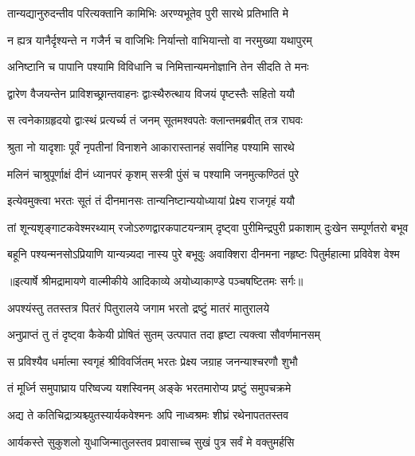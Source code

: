 \twolineshloka
{तान्यद्यानुरुदन्तीव परित्यक्तानि कामिभिः}
{अरण्यभूतेव पुरी सारथे प्रतिभाति मे} %

\twolineshloka
{न ह्यत्र यानैर्दृश्यन्ते न गजैर्न च वाजिभिः}
{निर्यान्तो वाभियान्तो वा नरमुख्या यथापुरम्} %

\twolineshloka
{अनिष्टानि च पापानि पश्यामि विविधानि च}
{निमित्तान्यमनोज्ञानि तेन सीदति ते मनः} %

\twolineshloka
{द्वारेण वैजयन्तेन प्राविशच्छ्रान्तवाहनः}
{द्वाःस्थैरुत्थाय विजयं पृष्टस्तैः सहितो ययौ} %

\twolineshloka
{स त्वनेकाग्रहृदयो द्वाःस्थं प्रत्यर्च्य तं जनम्}
{सूतमश्वपतेः क्लान्तमब्रवीत् तत्र राघवः} %

\twolineshloka
{श्रुता नो यादृशाः पूर्वं नृपतीनां विनाशने}
{आकारास्तानहं सर्वानिह पश्यामि सारथे} %

\twolineshloka
{मलिनं चाश्रुपूर्णाक्षं दीनं ध्यानपरं कृशम्}
{सस्त्री पुंसं च पश्यामि जनमुत्कण्ठितं पुरे} %

\twolineshloka
{इत्येवमुक्त्वा भरतः सूतं तं दीनमानसः}
{तान्यनिष्टान्ययोध्यायां प्रेक्ष्य राजगृहं ययौ} %

\fourlineindentedshloka
{तां शून्यशृङ्गाटकवेश्मरथ्याम्}
{रजोऽरुणद्वारकपाटयन्त्राम्}
{दृष्ट्वा पुरीमिन्द्रपुरी प्रकाशाम्}
{दुःखेन सम्पूर्णतरो बभूव} %

\fourlineindentedshloka
{बहूनि पश्यन्मनसोऽप्रियाणि}
{यान्यन्न्यदा नास्य पुरे बभूवुः}
{अवाक्शिरा दीनमना नहृष्टः}
{पितुर्महात्मा प्रविवेश वेश्म} %


{॥इत्यार्षे श्रीमद्रामायणे वाल्मीकीये आदिकाव्ये अयोध्याकाण्डे पञ्चषष्टितमः सर्गः॥}


\twolineshloka
{अपश्यंस्तु ततस्तत्र पितरं पितुरालये}
{जगाम भरतो द्रष्टुं मातरं मातुरालये} %

\twolineshloka
{अनुप्राप्तं तु तं दृष्ट्वा कैकेयी प्रोषितं सुतम्}
{उत्पपात तदा हृष्टा त्यक्त्वा सौवर्णमानसम्} %

\twolineshloka
{स प्रविश्यैव धर्मात्मा स्वगृहं श्रीविवर्जितम्}
{भरतः प्रेक्ष्य जग्राह जनन्याश्चरणौ शुभौ} %

\twolineshloka
{तं मूर्ध्नि समुपाघ्राय परिष्वज्य यशस्विनम्}
{अङ्के भरतमारोप्य प्रष्टुं समुपचक्रमे} %

\twolineshloka
{अद्य ते कतिचिद्रात्र्यश्च्युतस्यार्यकवेश्मनः}
{अपि नाध्वश्रमः शीघ्रं रथेनापततस्तव} %

\twolineshloka
{आर्यकस्ते सुकुशलो युधाजिन्मातुलस्तव}
{प्रवासाच्च सुखं पुत्र सर्वं मे वक्तुमर्हसि} %

